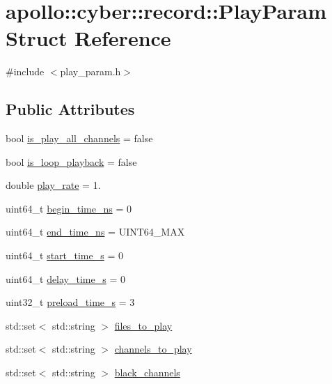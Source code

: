 \hypertarget{structapollo_1_1cyber_1_1record_1_1PlayParam}{\section{apollo\-:\-:cyber\-:\-:record\-:\-:Play\-Param Struct Reference}
\label{structapollo_1_1cyber_1_1record_1_1PlayParam}
}


{\ttfamily \#include $<$play\-\_\-param.\-h$>$}

\subsection*{Public Attributes}
\begin{DoxyCompactItemize}
\item 
bool \hyperlink{structapollo_1_1cyber_1_1record_1_1PlayParam_a6b1290678c59c2f72539f310b4081ab6}{is\-\_\-play\-\_\-all\-\_\-channels} = false
\item 
bool \hyperlink{structapollo_1_1cyber_1_1record_1_1PlayParam_a955bbc0e6fc32101be21e995dfa069ef}{is\-\_\-loop\-\_\-playback} = false
\item 
double \hyperlink{structapollo_1_1cyber_1_1record_1_1PlayParam_ae04dbf5694326031dad9969da95d21d7}{play\-\_\-rate} = 1.
\item 
uint64\-\_\-t \hyperlink{structapollo_1_1cyber_1_1record_1_1PlayParam_a83de3891ae9ea600af05823001510a25}{begin\-\_\-time\-\_\-ns} = 0
\item 
uint64\-\_\-t \hyperlink{structapollo_1_1cyber_1_1record_1_1PlayParam_a24c2a12ff114d45e9ca03692d719cffe}{end\-\_\-time\-\_\-ns} = U\-I\-N\-T64\-\_\-\-M\-A\-X
\item 
uint64\-\_\-t \hyperlink{structapollo_1_1cyber_1_1record_1_1PlayParam_ad47628af7a81f39cf99e5a91e07920b7}{start\-\_\-time\-\_\-s} = 0
\item 
uint64\-\_\-t \hyperlink{structapollo_1_1cyber_1_1record_1_1PlayParam_a976af29b30740dcf343c9ab5f0261d14}{delay\-\_\-time\-\_\-s} = 0
\item 
uint32\-\_\-t \hyperlink{structapollo_1_1cyber_1_1record_1_1PlayParam_a91947975bc9f81a3191e0f288ef8daea}{preload\-\_\-time\-\_\-s} = 3
\item 
std\-::set$<$ std\-::string $>$ \hyperlink{structapollo_1_1cyber_1_1record_1_1PlayParam_a804a341003f70ea77edac2a16c27200f}{files\-\_\-to\-\_\-play}
\item 
std\-::set$<$ std\-::string $>$ \hyperlink{structapollo_1_1cyber_1_1record_1_1PlayParam_aa288fd591320af1f97dff4754f79fa5e}{channels\-\_\-to\-\_\-play}
\item 
std\-::set$<$ std\-::string $>$ \hyperlink{structapollo_1_1cyber_1_1record_1_1PlayParam_a098a61b23644e187d8ae5fa34b8f8769}{black\-\_\-channels}
\end{DoxyCompactItemize}


